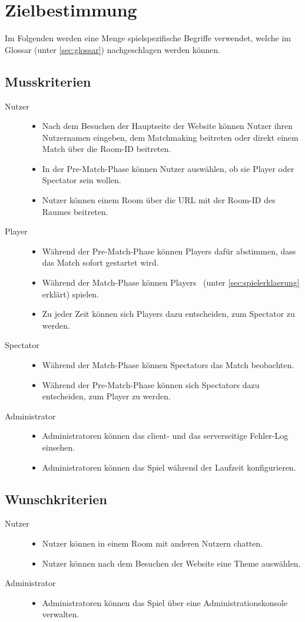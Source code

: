\section{Zielbestimmung}

\newcommand{\crit}[2]{
	\item[#1] \hfill
		\begin{itemize}
			#2
		\end{itemize}
}

Im Folgenden werden eine Menge spielspezifische Begriffe verwendet, welche im Glossar (unter \ref{sec:glossar}) nachgeschlagen werden können.

\subsection{Musskriterien}
\begin{description}
	\crit{Nutzer}{
		\item Nach dem Besuchen der Hauptseite der Website können Nutzer ihren Nutzernamen eingeben, dem Matchmaking beitreten oder direkt einem Match über die Room-ID beitreten.
		\item In der Pre-Match-Phase können Nutzer auswählen, ob sie Player oder Spectator sein wollen.
		\item Nutzer können einem Room über die URL mit der Room-ID des Raumes beitreten.
	}
	\crit{Player}{
		\item Während der Pre-Match-Phase können Players dafür abstimmen, dass das Match sofort gestartet wird.
		\item Während der Match-Phase können Players \vires\ (unter \ref{sec:spielerklaerung} erklärt) spielen.
		\item Zu jeder Zeit können sich Players dazu entscheiden, zum Spectator zu werden.
	}
	\crit{Spectator}{
		\item Während der Match-Phase können Spectators das Match beobachten.
		\item Während der Pre-Match-Phase können sich Spectators dazu entscheiden, zum Player zu werden.
	}
	\crit{Administrator}{
		\item Administratoren können das client- und das serverseitige Fehler-Log einsehen.
		\item Administratoren können das Spiel während der Laufzeit konfigurieren.
	}
\end{description}

\subsection{Wunschkriterien}
\begin{description}
	\crit{Nutzer}{
		\item Nutzer können in einem Room mit anderen Nutzern chatten.
		\item Nutzer können nach dem Besuchen der Website eine Theme auswählen.
	}
	\crit{Administrator}{
		\item Administratoren können das Spiel über eine Administrationskonsole verwalten.
	}
\end{description}

